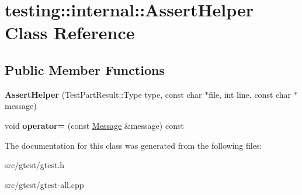 \hypertarget{classtesting_1_1internal_1_1_assert_helper}{}\section{testing\+:\+:internal\+:\+:Assert\+Helper Class Reference}
\label{classtesting_1_1internal_1_1_assert_helper}
\subsection*{Public Member Functions}
\begin{DoxyCompactItemize}
\item 
\mbox{\label{classtesting_1_1internal_1_1_assert_helper_ac2c9334518fd4087189b4505567a3c90}} 
{\bfseries Assert\+Helper} (Test\+Part\+Result\+::\+Type type, const char $\ast$file, int line, const char $\ast$message)
\item 
\mbox{\label{classtesting_1_1internal_1_1_assert_helper_a97bf22d786131ab7baa86b97a27aeb4d}} 
void {\bfseries operator=} (const \mbox{\hyperlink{classtesting_1_1_message}{Message}} \&message) const
\end{DoxyCompactItemize}


The documentation for this class was generated from the following files\+:\begin{DoxyCompactItemize}
\item 
src/gtest/gtest.\+h\item 
src/gtest/gtest-\/all.\+cpp\end{DoxyCompactItemize}
